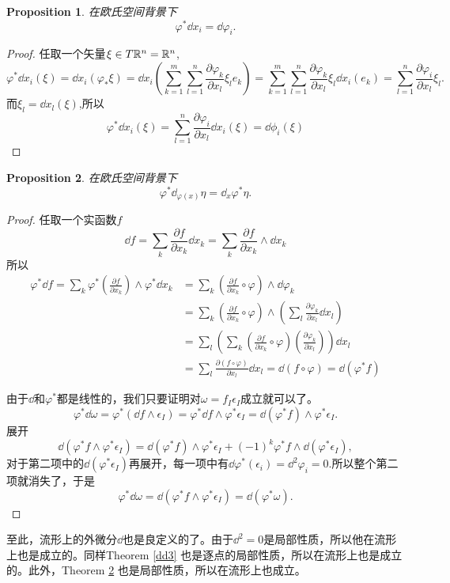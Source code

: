 \documentclass[8pt]{book}
\theoremstyle{plain}%
\newtheorem{pro}{Proposition}[section]%
\begin{document}
\begin{pro}在欧氏空间背景下\[\varphi^*\dd x_i=\dd \varphi_i.\]
\end{pro}
\begin{proof}
任取一个矢量$\xi \in T\mathbb{R}^n=\mathbb{R}^n$,
\[
\varphi^*\dd x_i(\xi)=\dd x_i (\varphi_*\xi)=\dd x_i \left(\sum_{k=1}^m\sum_{l=1}^n\frac{\partial \varphi_k}{\partial x_l}\xi_l e_k\right)= \sum_{k=1}^m\sum_{l=1}^n\frac{\partial \varphi_k}{\partial x_l}\xi_l \dd x_i(e_k)=\sum_{l=1}^n\frac{\partial \varphi_i}{\partial x_l}\xi_l.
\]
而$\xi_l=\dd x_l(\xi)$,所以
\[
\varphi^*\dd x_i(\xi)=\sum_{l=1}^n\frac{\partial \varphi_i}{\partial x_l}\dd x_i(\xi)=\dd \phi_i (\xi)
\]
\end{proof}
\begin{pro}在欧氏空间背景下\[\varphi^* \dd_{\varphi(x)} \eta=\dd _x\varphi^* \eta.\]
\label{dd4}
\end{pro}
\begin{proof}
任取一个实函数$f$
\[
\dd f =\sum_k \frac{\partial f}{\partial x_k}\dd x_k=\sum_k \frac{\partial f}{\partial x_k}\wedge\dd x_k
\]
所以
\[
\begin{split}
\varphi^* \dd f =\sum_k \varphi^*\left(\frac{\partial f}{\partial x_k}\right)\wedge\varphi^*\dd x_k&=\sum_k\left(\frac{\partial f}{\partial x_k}\circ \varphi\right)\wedge \dd \varphi_k\\
&=\sum_k\left(\frac{\partial f}{\partial x_k}\circ \varphi\right)\wedge \left( \sum_l\frac{\partial\varphi_k}{\partial x_l} \dd x_l\right)\\
&=\sum_{l}\left(\sum_k\left(\frac{\partial f}{\partial x_k}\circ \varphi\right) \left(\frac{\partial\varphi_k}{\partial x_l} \right)\right)\dd x_l\\
&=\sum_{l}\frac{\partial (f\circ \varphi)}{\partial x_l}\dd x_l=\dd(f\circ \varphi)=\dd(\varphi^*f)
\end{split}
\]

由于$\dd$和$\varphi^*$都是线性的，我们只要证明对$\omega=f_I\epsilon_I$成立就可以了。
\[
\varphi^*\dd \omega=\varphi^*(\dd f \wedge \epsilon_I)=\varphi^*\dd f \wedge \varphi^*\epsilon_I=\dd(\varphi^* f) \wedge \varphi^*\epsilon_I.
\]
展开
\[
\dd(\varphi^* f \wedge \varphi^*\epsilon_I)=\dd(\varphi^* f) \wedge \varphi^*\epsilon_I+(-1)^k\varphi^* f \wedge \dd(\varphi^*\epsilon_I),
\]
对于第二项中的$\dd(\varphi^*\epsilon_I)$再展开，每一项中有$\dd\varphi^*(\epsilon_i)=\dd^2\varphi_i=0$.所以整个第二项就消失了，于是
\[
\varphi^*\dd \omega=\dd(\varphi^* f \wedge \varphi^*\epsilon_I)=\dd (\varphi^* \omega).
\]
\end{proof}
至此，流形上的外微分$\dd$也是良定义的了。由于$\dd^2=0$是局部性质，所以他在流形上也是成立的。同样Theorem \ref{dd3} 也是逐点的局部性质，所以在流形上也是成立的。此外，Theorem \ref{dd4} 也是局部性质，所以在流形上也成立。
\end{document}
